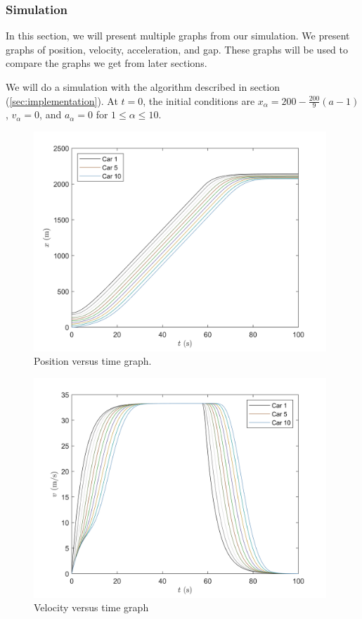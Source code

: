 \documentclass[12pt]{article}
\begin{document}
    \subsubsection{Simulation}
    In this section, we will present multiple graphs from our simulation. We present graphs of position, velocity, acceleration, and gap. These graphs will be used to compare the graphs we get from later sections. 
    
    We will do a simulation with the algorithm described in section (\ref{sec:implementation}). At $t=0$, the initial conditions are $x_\alpha = 
    200-\frac{200}{9}\left(a-1\right)$, $v_\alpha = 0$, and $a_\alpha = 0$ for $1 \leq \alpha \leq 10$. 
      \begin{figure}[H]
          \includegraphics[width=11cm]{HomogeneousTraffic1.png}
          \centering
          \caption{Position versus time graph.}
      \end{figure}

      \begin{figure}[H]
        \includegraphics[width=11cm]{HomogeneousTraffic2.png}
        \centering
        \caption{Velocity versus time graph}
      \end{figure}
\end{document}
